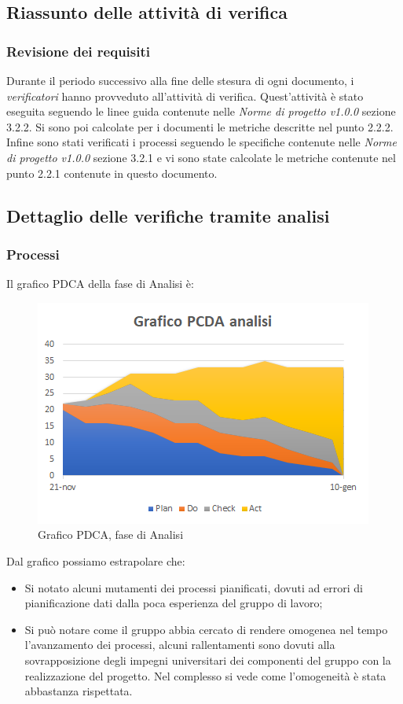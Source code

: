 \subsection{Riassunto delle attività di verifica}
\subsubsection{Revisione dei requisiti}
Durante il periodo successivo alla fine delle stesura di ogni documento, i \emph{verificatori}  hanno provveduto all'attività di verifica. Quest'attività è stato eseguita seguendo le linee guida contenute nelle \emph{Norme di progetto v1.0.0} sezione 3.2.2.
Si sono poi calcolate per i documenti le metriche descritte nel punto 2.2.2.
Infine sono stati verificati i processi seguendo le specifiche contenute nelle \emph{Norme di progetto v1.0.0} sezione 3.2.1 e vi sono state calcolate le metriche contenute nel punto 2.2.1 contenute in questo documento.
\subsection{Dettaglio delle verifiche tramite analisi}
\subsubsection{Processi}
Il grafico PDCA della fase di Analisi è:
\begin{figure} [H]
	\centering
	\includegraphics[scale=1]{Img/Grafico_PCDA}
	\caption{Grafico PDCA, fase di Analisi}\label{}
\end{figure}
Dal grafico possiamo estrapolare che:
\begin{itemize}
	\item Si notato alcuni mutamenti dei processi pianificati, dovuti ad errori di pianificazione dati dalla poca esperienza del gruppo di lavoro;
	\item Si può notare come il gruppo abbia cercato di rendere omogenea nel tempo l'avanzamento dei processi, alcuni rallentamenti sono dovuti alla sovrapposizione degli impegni
	universitari dei componenti del gruppo con la realizzazione del progetto. Nel complesso si vede come l'omogeneità è stata abbastanza rispettata.
\end{itemize}
